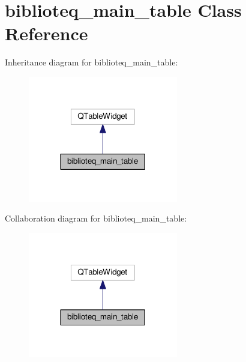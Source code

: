 \hypertarget{classbiblioteq__main__table}{}\section{biblioteq\+\_\+main\+\_\+table Class Reference}
\label{classbiblioteq__main__table}


Inheritance diagram for biblioteq\+\_\+main\+\_\+table\+:
\nopagebreak
\begin{figure}[H]
\begin{center}
\leavevmode
\includegraphics[width=185pt]{classbiblioteq__main__table__inherit__graph}
\end{center}
\end{figure}


Collaboration diagram for biblioteq\+\_\+main\+\_\+table\+:
\nopagebreak
\begin{figure}[H]
\begin{center}
\leavevmode
\includegraphics[width=185pt]{classbiblioteq__main__table__coll__graph}
\end{center}
\end{figure}
